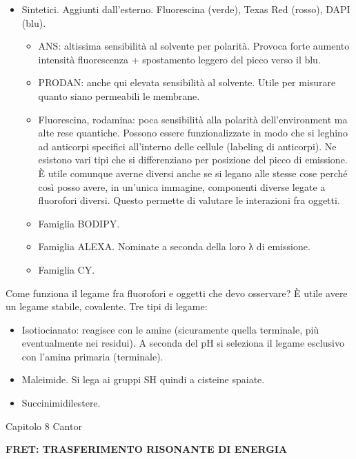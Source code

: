 \begin{itemize}
\item
  Sintetici. Aggiunti dall'esterno. Fluorescina (verde), Texas Red
  (rosso), DAPI (blu).

  \begin{itemize}
  \item
    ANS: altissima sensibilità al solvente per polarità. Provoca forte
    aumento intensità fluorescenza + spostamento leggero del picco verso
    il blu.
  \item
    PRODAN: anche qui elevata sensibilità al solvente. Utile per
    misurare quanto siano permeabili le membrane.
  \item
    Fluorescina, rodamina: poca sensibilità alla polarità
    dell'environment ma alte rese quantiche. Possono essere
    funzionalizzate in modo che si leghino ad anticorpi specifici
    all'interno delle cellule (labeling di anticorpi). Ne esistono vari
    tipi che si differenziano per posizione del picco di emissione. È
    utile comunque averne diversi anche se si legano alle stesse cose
    perché così posso avere, in un'unica immagine, componenti diverse
    legate a fluorofori diversi. Questo permette di valutare le
    interazioni fra oggetti.
  \item
    Famiglia BODIPY.
  \item
    Famiglia ALEXA. Nominate a seconda della loro λ di emissione.
  \item
    Famiglia CY.
  \end{itemize}
\end{itemize}

Come funziona il legame fra fluorofori e oggetti che devo osservare? È
utile avere un legame stabile, covalente. Tre tipi di legame:

\begin{itemize}
\item
  Isotiocianato: reagisce con le amine (sicuramente quella terminale,
  più eventualmente nei residui). A seconda del pH si seleziona il
  legame esclusivo con l'amina primaria (terminale).
\item
  Maleimide. Si lega ai gruppi SH quindi a cisteine spaiate.
\item
  Succinimidilestere.
\end{itemize}

Capitolo 8 Cantor

\textbf{FRET: TRASFERIMENTO RISONANTE DI ENERGIA}

